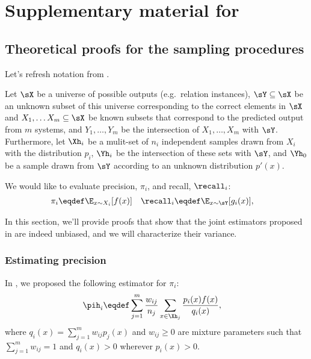 \chapter{Supplementary material for } 
\label{chap:kbpo-appendix}

\section{Theoretical proofs for the sampling procedures}
\label{sec:sampling}

Let's refresh notation from .

Let $\sX$ be a universe of possible outputs (e.g.\ relation instances),
  $\sY \subseteq \sX$ be an unknown subset of this universe corresponding to the correct elements in $\sX$ and
  $X_1, \ldots X_m \subseteq \sX$ be known subsets that correspond to the predicted output from $m$ systems,
  and $Y_1, \ldots, Y_m$ be the intersection of $X_1, \ldots, X_m$ with $\sY$.
Furthermore, 
  let $\Xh_i$ be a mulit-set of $n_i$ independent samples drawn from $X_i$ with the distribution $p_i$,
  $\Yh_i$ be the intersection of these sets with $\sY$, and
  $\Yh_0$ be a sample drawn from $\sY$ according to an unknown distribution $p'(x)$.

We would like to evaluate precision, $\pi_i$, and recall, $\recall_i$:
\begin{align*}
  \pi_i  &\eqdef \E_{x \sim X_i}[f(x)] &
  \recall_i &\eqdef \E_{x \sim \sY}[g_i(x)],
\end{align*}

In this section, we'll provide proofs that show that the joint estimators proposed in  are indeed unbiased, and we will characterize their variance.

\subsection{Estimating precision}

In , we proposed the following estimator for $\pi_i$:
\begin{align*}
  \pih_i &\eqdef \sum_{j=1}^m \frac{w_{ij}}{n_j} \sum_{x \in \Xh_j} \frac{p_i(x) f(x)}{q_i(x)},
\end{align*}
where $q_i(x) = \sum_{j=1}^m w_{ij} p_j(x)$ and $w_{ij} \ge 0$ are mixture parameters such that $\sum_{j=1}^m w_{ij} = 1$ and $q_i(x) > 0$ wherever $p_i(x) > 0$.

